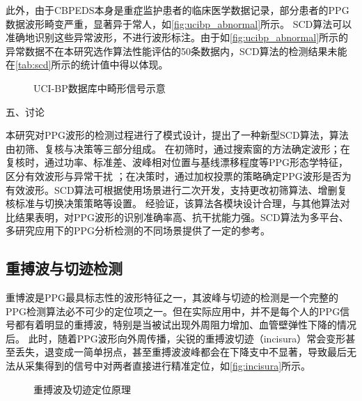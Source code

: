 此外，由于CBPEDS本身是重症监护患者的临床医学数据记录，部分患者的PPG数据波形畸变严重，显著异于常人，如\autoref{fig:ucibp_abnormal}所示。
SCD算法可以准确地识别这些异常波形，不进行波形标注。由于如\autoref{fig:ucibp_abnormal}所示的异常数据不在本研究选作算法性能评估的50条数据内，SCD算法的检测结果未能在\autoref{tab:scd}所示的统计值中得以体现。

\begin{figure}[h]
    \centering
    \quad
    \quad
    \caption{\label{fig:ucibp_abnormal}UCI-BP数据库中畸形信号示意}
\end{figure}

五、讨论

本研究对PPG波形的检测过程进行了模式设计，提出了一种新型SCD算法，算法由初筛、复核与决策等三部分组成。
在初筛时，通过搜索窗的方法确定波形；在复核时，通过功率、标准差、波峰相对位置与基线漂移程度等PPG形态学特征，区分有效波形与异常干扰
；在决策时，通过加权投票的策略确定PPG波形是否为有效波形。SCD算法可根据使用场景进行二次开发，支持更改初筛算法、增删复核标准与切换决策策略等设置。
经验证，该算法各模块设计合理，与其他算法对比结果表明，对PPG波形的识别准确率高、抗干扰能力强。SCD算法为多平台、多研究应用下的PPG分析检测的不同场景提供了一定的参考。

\subsection{重搏波与切迹检测}
重博波是PPG最具标志性的波形特征之一，其波峰与切迹的检测是一个完整的PPG检测算法必不可少的定位项之一\cite{Wang2012}。但在实际应用中，并不是每个人的PPG信号都有着明显的重搏波，特别是当被试出现外周阻力增加、血管壁弹性下降的情况后\cite{mmt}。
此时，随着PPG波形向外周传播，尖锐的重搏波切迹（incisura）常会变形甚至丢失，退变成一简单拐点，甚至重搏波波峰都会在下降支中不显著，导致最后无法从采集得到的信号中对两者直接进行精准定位，如\autoref{fig:incisura}所示。

\begin{figure}[htbp]
    \centering
    \quad
    \caption[重搏波及切迹定位原理]{\label{fig:incisura}重搏波及切迹定位原理\cite{Wang2012,Su2014}}
\end{figure}

